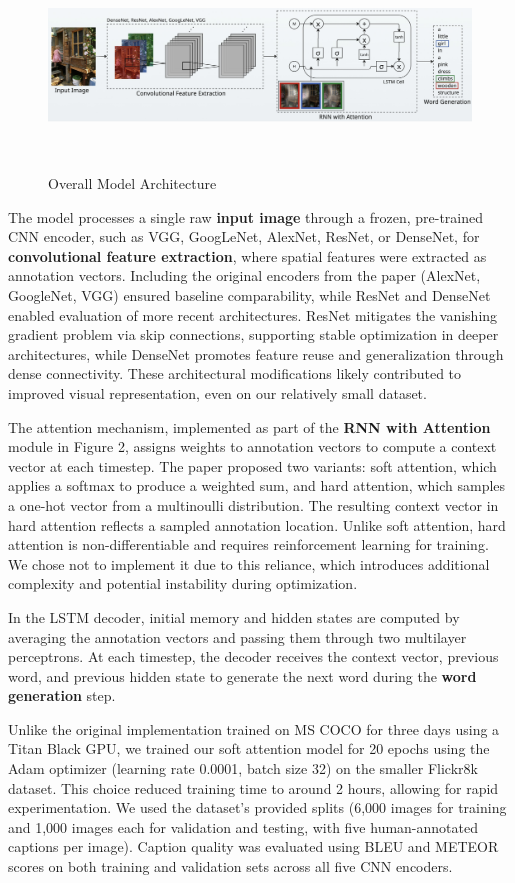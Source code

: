 \documentclass{article}
\begin{document}
\begin{figure}[h]
    \centering
    \includegraphics[scale=0.2]{methodology.png}
    \caption{Overall Model Architecture}
    \
\end{figure}
The model processes a single raw \textbf{input image} through a frozen, pre-trained CNN encoder, such as VGG, GoogLeNet, AlexNet, ResNet, or DenseNet, for \textbf{convolutional feature extraction}, where spatial features were extracted as annotation vectors. Including the original encoders from the paper (AlexNet, GoogleNet, VGG) ensured baseline comparability, while ResNet and DenseNet enabled evaluation of more recent architectures. ResNet mitigates the vanishing gradient problem via skip connections, supporting stable optimization in deeper architectures, while DenseNet promotes feature reuse and generalization through dense connectivity. These architectural modifications likely contributed to improved visual representation, even on our relatively small dataset.

The attention mechanism, implemented as part of the \textbf{RNN with Attention} module in Figure 2, assigns weights to annotation vectors to compute a context vector at each timestep. The paper proposed two variants: soft attention, which applies a softmax to produce a weighted sum, and hard attention, which samples a one-hot vector from a multinoulli distribution. The resulting context vector in hard attention reflects a sampled annotation location. Unlike soft attention, hard attention is non-differentiable and requires reinforcement learning for training. We chose not to implement it due to this reliance, which introduces additional complexity and potential instability during optimization.
 
In the LSTM decoder, initial memory and hidden states are computed by averaging the annotation vectors and passing them through two multilayer perceptrons. At each timestep, the decoder receives the context vector, previous word, and previous hidden state to generate the next word during the \textbf{word generation} step.

Unlike the original implementation trained on MS COCO for three days using a Titan Black GPU, we trained our soft attention model for 20 epochs using the Adam optimizer (learning rate 0.0001, batch size 32) on the smaller Flickr8k dataset. This choice reduced training time to around 2 hours, allowing for rapid experimentation. We used the dataset’s provided splits (6,000 images for training and 1,000 images each for validation and testing, with five human-annotated captions per image). Caption quality was evaluated using BLEU and METEOR scores on both training and validation sets across all five CNN encoders.
\end{document}
